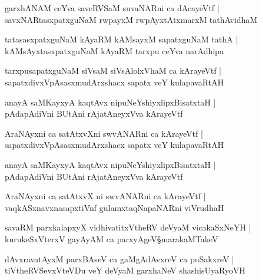 \begin{shloka}
garxhANAM ceYva saveRVSaM suvaNARni ca dAcayeVtf |\\
savxNARtasxpatxguNaM rwpayxM rwpAyxtAtxmarxM tathAvidhaM
\end{shloka}

\begin{shloka}
tatasasxpatxguNaM kAyaRM kAMsayxM sapatxguNaM tathA |\\
kAMsAyxtasxpatxguNaM kAyaRM tarxpu ceYva narAdhipa
\end{shloka}

\begin{shloka}
tarxpusapatxguNaM siVsaM siVsAlolxVhaM ca kArayeVtf |\\
sapatxdivxVpAsasxmudArxshacx sapatx veY kulapavaRtAH 
\end{shloka}

\begin{shloka}
anayA saMKayxyA kaqtAvx nipuNeYshiyxlipxBisatxtaH |\\
pAdapAdiVni BUtAni rAjatAneyxVva kArayeVtf
\end{shloka}

\begin{shloka}
AraNAyxni ca satAtxvXni swvANARni ca kArayeVtf |\\
sapatxdivxVpAsasxmudArxshacx sapatx veY kulapavaRtAH 
\end{shloka}

\begin{shloka}
anayA saMKayxyA kaqtAvx nipuNeYshiyxlipxBisatxtaH |\\
pAdapAdiVni BUtAni rAjatAneyxVva kArayeVtf 
\end{shloka}

\begin{shloka}
AraNAyxni ca satAtxvX ni swvANARni ca kArayeVtf |\\
vaqkASxnavxnasapxtiVnf gulamxtaqNapaNARni viVrudhaH 
\end{shloka}

\begin{shloka}
savaRM parxkalapxyX vidhivatitxVtheRV deVyaM vicakaSxNeYH |\\
kurukeSxVterxV gayAyAM ca parxyAgeV\S marakaMTakeV
\end{shloka}

\begin{shloka}
dAvxravatAyxM parxBAseV ca gaMgAdAvxreV ca puSakxreV |\\
tiVtheRVSevxVteVDu veY deVyaM garxhaNeV shashisUyaRyoVH 
\end{shloka}


